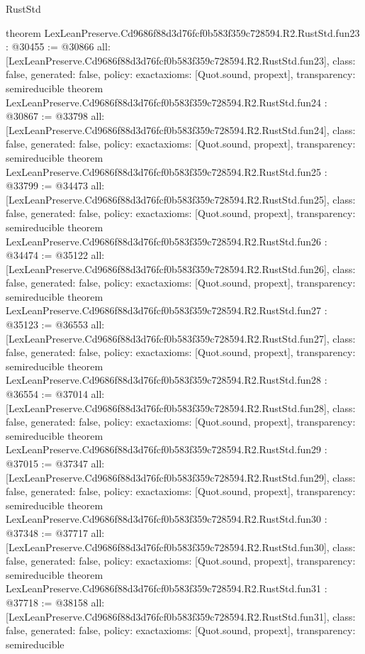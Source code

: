 \begin{lexlean}{RustStd}
\begin{coremodule}
{}
theorem LexLeanPreserve.Cd9686f88d3d76fcf0b583f359c728594.R2.RustStd.fun23 : @30455 := @30866 {
  all: [LexLeanPreserve.Cd9686f88d3d76fcf0b583f359c728594.R2.RustStd.fun23],
  class: false,
  generated: false,
  policy: exact{axioms: [Quot.sound, propext]},
  transparency: semireducible
}
theorem LexLeanPreserve.Cd9686f88d3d76fcf0b583f359c728594.R2.RustStd.fun24 : @30867 := @33798 {
  all: [LexLeanPreserve.Cd9686f88d3d76fcf0b583f359c728594.R2.RustStd.fun24],
  class: false,
  generated: false,
  policy: exact{axioms: [Quot.sound, propext]},
  transparency: semireducible
}
theorem LexLeanPreserve.Cd9686f88d3d76fcf0b583f359c728594.R2.RustStd.fun25 : @33799 := @34473 {
  all: [LexLeanPreserve.Cd9686f88d3d76fcf0b583f359c728594.R2.RustStd.fun25],
  class: false,
  generated: false,
  policy: exact{axioms: [Quot.sound, propext]},
  transparency: semireducible
}
theorem LexLeanPreserve.Cd9686f88d3d76fcf0b583f359c728594.R2.RustStd.fun26 : @34474 := @35122 {
  all: [LexLeanPreserve.Cd9686f88d3d76fcf0b583f359c728594.R2.RustStd.fun26],
  class: false,
  generated: false,
  policy: exact{axioms: [Quot.sound, propext]},
  transparency: semireducible
}
theorem LexLeanPreserve.Cd9686f88d3d76fcf0b583f359c728594.R2.RustStd.fun27 : @35123 := @36553 {
  all: [LexLeanPreserve.Cd9686f88d3d76fcf0b583f359c728594.R2.RustStd.fun27],
  class: false,
  generated: false,
  policy: exact{axioms: [Quot.sound, propext]},
  transparency: semireducible
}
theorem LexLeanPreserve.Cd9686f88d3d76fcf0b583f359c728594.R2.RustStd.fun28 : @36554 := @37014 {
  all: [LexLeanPreserve.Cd9686f88d3d76fcf0b583f359c728594.R2.RustStd.fun28],
  class: false,
  generated: false,
  policy: exact{axioms: [Quot.sound, propext]},
  transparency: semireducible
}
theorem LexLeanPreserve.Cd9686f88d3d76fcf0b583f359c728594.R2.RustStd.fun29 : @37015 := @37347 {
  all: [LexLeanPreserve.Cd9686f88d3d76fcf0b583f359c728594.R2.RustStd.fun29],
  class: false,
  generated: false,
  policy: exact{axioms: [Quot.sound, propext]},
  transparency: semireducible
}
theorem LexLeanPreserve.Cd9686f88d3d76fcf0b583f359c728594.R2.RustStd.fun30 : @37348 := @37717 {
  all: [LexLeanPreserve.Cd9686f88d3d76fcf0b583f359c728594.R2.RustStd.fun30],
  class: false,
  generated: false,
  policy: exact{axioms: [Quot.sound, propext]},
  transparency: semireducible
}
theorem LexLeanPreserve.Cd9686f88d3d76fcf0b583f359c728594.R2.RustStd.fun31 : @37718 := @38158 {
  all: [LexLeanPreserve.Cd9686f88d3d76fcf0b583f359c728594.R2.RustStd.fun31],
  class: false,
  generated: false,
  policy: exact{axioms: [Quot.sound, propext]},
  transparency: semireducible
}
\end{coremodule}
\end{lexlean}
